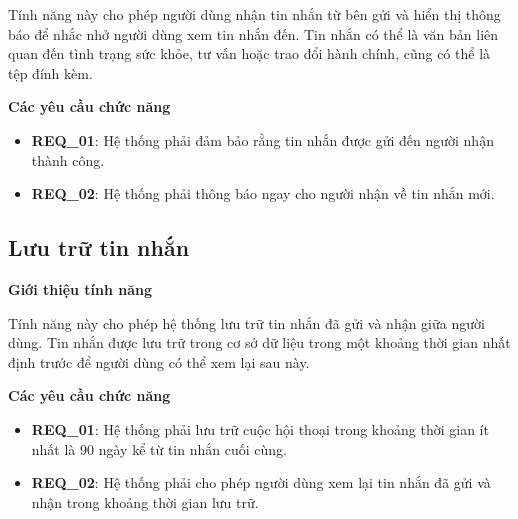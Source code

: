 Tính năng này cho phép người dùng nhận tin nhắn từ bên gửi và hiển thị thông báo để nhắc nhở người dùng xem tin nhắn đến. Tin nhắn có thể là văn bản liên quan đến tình trạng sức khỏe, tư vấn hoặc trao đổi hành chính, cũng có thể là tệp đính kèm.

\noindent \textbf{Các yêu cầu chức năng}

\begin{itemize}
  \item \textbf{REQ\_01}: Hệ thống phải đảm bảo rằng tin nhắn được gửi đến người nhận thành công.
  \item \textbf{REQ\_02}: Hệ thống phải thông báo ngay cho người nhận về tin nhắn mới.
\end{itemize}

\subsection{Lưu trữ tin nhắn}

\noindent \textbf{Giới thiệu tính năng}

Tính năng này cho phép hệ thống lưu trữ tin nhắn đã gửi và nhận giữa người dùng. Tin nhắn được lưu trữ trong cơ sở dữ liệu trong một khoảng thời gian nhất định trước để người dùng có thể xem lại sau này.

\noindent \textbf{Các yêu cầu chức năng}

\begin{itemize}
  \item \textbf{REQ\_01}: Hệ thống phải lưu trữ cuộc hội thoại trong khoảng thời gian ít nhất là 90 ngày kể từ tin nhắn cuối cùng.
  \item \textbf{REQ\_02}: Hệ thống phải cho phép người dùng xem lại tin nhắn đã gửi và nhận trong khoảng thời gian lưu trữ.
\end{itemize}
